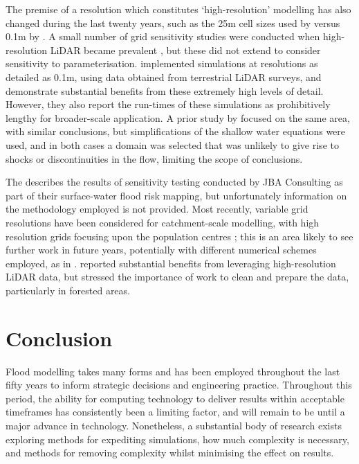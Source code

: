 The premise of a resolution which constitutes `high-resolution' modelling has also changed during the last twenty years, such as the 25m cell sizes used by \citet{Bates2003} versus 0.1m by \citet{Ozdemir2013}. A small number of grid sensitivity studies were conducted when high-resolution LiDAR became prevalent \citep[e.g.][]{Haile2005}, but these did not extend to consider sensitivity to parameterisation. \citet{Ozdemir2013} implemented simulations at resolutions as detailed as 0.1m, using data obtained from terrestrial LiDAR surveys, and demonstrate substantial benefits from these extremely high levels of detail. However, they also report the run-times of these simulations as prohibitively lengthy for broader-scale application. A prior study by \citet{Fewtrell2011} focused on the same area, with similar conclusions, but simplifications of the shallow water equations were used, and in both cases a domain was selected that was unlikely to give rise to shocks or discontinuities in the flow, limiting the scope of conclusions.

The \citet{EnvironmentAgency2013} describes the results of sensitivity testing conducted by JBA Consulting as part of their surface-water flood risk mapping, but unfortunately information on the methodology employed is not provided. Most recently, variable grid resolutions have been considered for catchment-scale modelling, with high resolution grids focusing upon the population centres \citep[e.g.][]{Hartnett2017}; this is an area likely to see further work in future years, potentially with different numerical schemes employed, as in \citet{Zhang2015}. \citet{Hartnett2017} reported substantial benefits from leveraging high-resolution LiDAR data, but stressed the importance of work to clean and prepare the data, particularly in forested areas.

\section{Conclusion}

Flood modelling takes many forms and has been employed throughout the last fifty years to inform strategic decisions and engineering practice. Throughout this period, the ability for computing technology to deliver results within acceptable timeframes has consistently been a limiting factor, and will remain to be until a major advance in technology. Nonetheless, a substantial body of research exists exploring methods for expediting simulations, how much complexity is necessary, and methods for removing complexity whilst minimising the effect on results.


